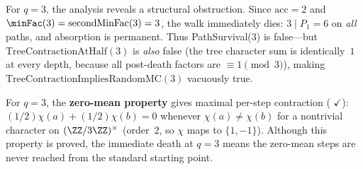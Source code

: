 For $q = 3$, the analysis reveals a structural obstruction.
Since $\mathrm{acc} = 2$ and $\minFac(3) = \operatorname{secondMinFac}(3) = 3$,
the walk immediately dies: $3 \mid P_1 = 6$ on \emph{all} paths,
and absorption is permanent.
Thus PathSurvival(3) is false---but
$\mathrm{TreeContractionAtHalf}(3)$ is \emph{also} false (the tree
character sum is identically~$1$ at every depth, because all
post-death factors are $\equiv 1 \pmod{3}$), making
$\mathrm{TreeContractionImpliesRandomMC}(3)$ vacuously true.

For $q = 3$, the \textbf{zero-mean property} gives maximal per-step
contraction
(
{\color{leanink}$\checkmark$}):
$(1/2)\chi(a) + (1/2)\chi(b) = 0$ whenever $\chi(a) \neq \chi(b)$
for a nontrivial character on $(\ZZ/3\ZZ)^\times$ (order~$2$, so
$\chi$ maps to $\{1, -1\}$).  Although this property is proved,
the immediate death at $q = 3$ means the zero-mean steps are
never reached from the standard starting point.

